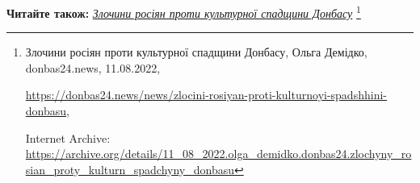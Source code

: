  
 
 
 
 

\textbf{Читайте також:} \href{https://archive.org/details/11_08_2022.olga_demidko.donbas24.zlochyny_rosian_proty_kulturn_spadchyny_donbasu}{\emph{Злочини росіян проти культурної спадщини Донбасу}}%
\footnote{Злочини росіян проти культурної спадщини Донбасу, Ольга Демідко, donbas24.news, 11.08.2022, \par%
\url{https://donbas24.news/news/zlocini-rosiyan-proti-kulturnoyi-spadshhini-donbasu}, \par%
Internet Archive: \url{https://archive.org/details/11_08_2022.olga_demidko.donbas24.zlochyny_rosian_proty_kulturn_spadchyny_donbasu}%
}
